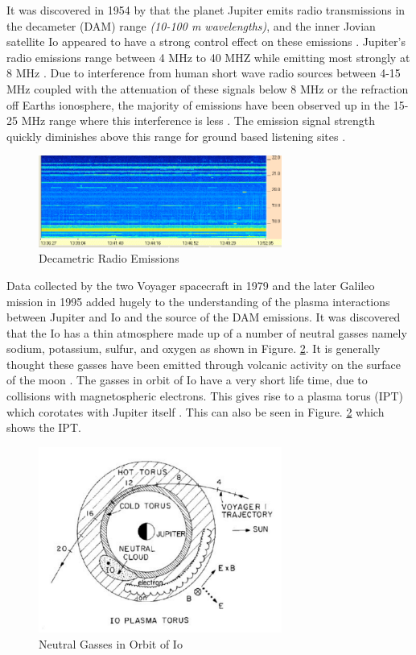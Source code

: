 \documentclass[runningheads,a4paper]{llncs}
\begin{document}
It was discovered in 1954 by \cite{burke55} that the planet Jupiter emits radio transmissions in the decameter (\gls{DAM}) range \textit{(10-100 m wavelengths)}, and the inner Jovian satellite Io appeared to have a strong control effect on these emissions \citep{belcher87}. Jupiter's radio emissions range between 4 MHz to 40 MHZ while emitting most strongly at 8 MHz  \citep{wilkinson94}. Due to interference from human short wave radio sources between 4-15 MHz coupled with the attenuation of these signals below 8 MHz or the refraction off Earths ionosphere, the majority of emissions have been observed up in the 15-25 MHz range where this interference is less \citep{wilkinson94}. The emission signal strength quickly diminishes above this range for ground based listening sites \citep{wilkinson94}.

%
\begin{figure}[here]
\centering
\includegraphics[width=8cm]{images/01}
\caption{Decametric Radio Emissions \citep{ashcraft13}}
\label{fig:dam_Emissions}
\end{figure}
%

Data collected by the two Voyager spacecraft in 1979 \citep{belcher87} and the later Galileo mission in 1995 \citep{kivelson96} added hugely to the understanding of the plasma interactions between Jupiter and Io and the source of the \gls{DAM} emissions. It was discovered that the Io has a thin atmosphere made up of a number of neutral gasses namely sodium, potassium, sulfur, and oxygen as shown in Figure. \ref{fig:io_neutral_gasses}. It is generally thought these gasses have been emitted through volcanic activity on the surface of the moon \citep{belcher87}. The gasses in orbit of Io have a very short life time, due to collisions with magnetospheric electrons. This gives rise to a plasma torus (\gls{IPT}) which corotates with Jupiter itself \citep{belcher87}. This can also be seen in Figure. \ref{fig:io_neutral_gasses} which shows the \gls{IPT}.

%
\begin{figure}[here]
\centering
\includegraphics[width=8cm]{images/02}
\caption{Neutral Gasses in Orbit of Io \citep{belcher87}}
\label{fig:io_neutral_gasses}
\end{figure}
%
\end{document}
